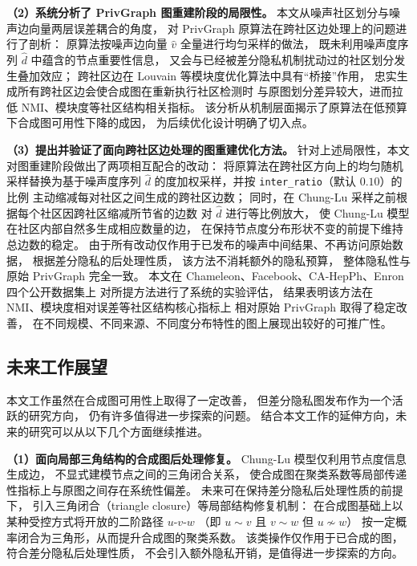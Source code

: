 \par \textbf{（2）系统分析了 PrivGraph 图重建阶段的局限性。}
本文从噪声社区划分与噪声边向量两层误差耦合的角度，
对 PrivGraph 原算法在跨社区边处理上的问题进行了剖析：
原算法按噪声边向量 $\hat{v}$ 全量进行均匀采样的做法，
既未利用噪声度序列 $\hat{d}$ 中蕴含的节点重要性信息，
又会与已经被差分隐私机制扰动过的社区划分发生叠加效应；
跨社区边在 Louvain 等模块度优化算法中具有``桥接''作用，
忠实生成所有跨社区边会使合成图在重新执行社区检测时
与原图划分差异较大，进而拉低 NMI、模块度等社区结构相关指标。
该分析从机制层面揭示了原算法在低预算下合成图可用性下降的成因，
为后续优化设计明确了切入点。

\par \textbf{（3）提出并验证了面向跨社区边处理的图重建优化方法。}
针对上述局限性，本文对图重建阶段做出了两项相互配合的改动：
将原算法在跨社区方向上的均匀随机采样替换为基于噪声度序列 $\hat{d}$
的度加权采样，并按 \texttt{inter\_ratio}（默认 $0.10$）的比例
主动缩减每对社区之间生成的跨社区边数；
同时，在 Chung-Lu 采样之前根据每个社区因跨社区缩减所节省的边数
对 $\hat{d}$ 进行等比例放大，
使 Chung-Lu 模型在社区内部自然多生成相应数量的边，
在保持节点度分布形状不变的前提下维持总边数的稳定。
由于所有改动仅作用于已发布的噪声中间结果、不再访问原始数据，
根据差分隐私的后处理性质，
该方法不消耗额外的隐私预算，
整体隐私性与原始 PrivGraph 完全一致。
本文在 Chameleon、Facebook、CA-HepPh、Enron 四个公开数据集上
对所提方法进行了系统的实验评估，
结果表明该方法在 NMI、模块度相对误差等社区结构核心指标上
相对原始 PrivGraph 取得了稳定改善，
在不同规模、不同来源、不同度分布特性的图上展现出较好的可推广性。

\subsection{未来工作展望}

\par 本文工作虽然在合成图可用性上取得了一定改善，
但差分隐私图发布作为一个活跃的研究方向，
仍有许多值得进一步探索的问题。
结合本文工作的延伸方向，未来的研究可以从以下几个方面继续推进。

\par \textbf{（1）面向局部三角结构的合成图后处理修复。}
Chung-Lu 模型仅利用节点度信息生成边，
不显式建模节点之间的三角闭合关系，
使合成图在聚类系数等局部传递性指标上与原图之间存在系统性偏差。
未来可在保持差分隐私后处理性质的前提下，
引入三角闭合（triangle closure）等局部结构修复机制：
在合成图基础上以某种受控方式将开放的二阶路径 $u\text{-}v\text{-}w$
（即 $u \sim v$ 且 $v \sim w$ 但 $u \not\sim w$）
按一定概率闭合为三角形，从而提升合成图的聚类系数。
该类操作仅作用于已合成的图，符合差分隐私后处理性质，
不会引入额外隐私开销，是值得进一步探索的方向。

